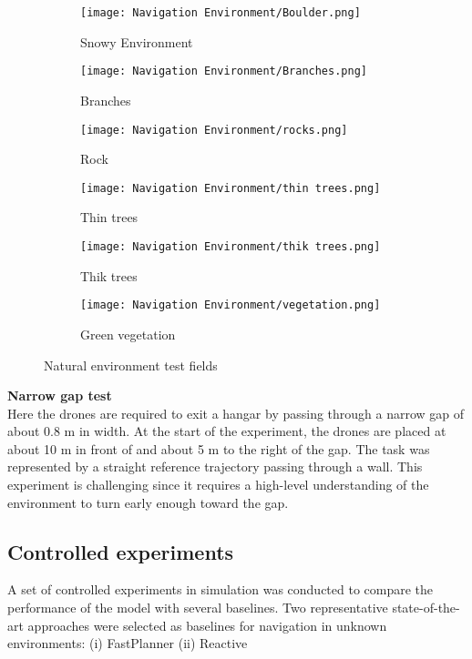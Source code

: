 \begin{figure}[!h]
	\centering
	\begin{subfigure}[b]{0.29\textwidth}
		\centering
		\texttt{[image: Navigation Environment/Boulder.png]}
		\caption{Snowy Environment}
	\end{subfigure}
	\hfill
	\begin{subfigure}[b]{0.29\textwidth}
		\centering
		\texttt{[image: Navigation Environment/Branches.png]}
		\caption{Branches}
	\end{subfigure}
	\hfill	
	\begin{subfigure}[b]{0.29\textwidth}
		\centering
		\texttt{[image: Navigation Environment/rocks.png]}
		\caption{Rock}
	\end{subfigure}
	\hfill
	\begin{subfigure}[b]{0.29\textwidth}
		\centering
		\texttt{[image: Navigation Environment/thin trees.png]}
		\caption{Thin trees}
	\end{subfigure}
	\hfill
	\begin{subfigure}[b]{0.29\textwidth}
		\centering
		\texttt{[image: Navigation Environment/thik trees.png]}
		\caption{Thik trees}
	\end{subfigure}
	\hfill
	\begin{subfigure}[b]{0.29\textwidth}
		\centering
		\texttt{[image: Navigation Environment/vegetation.png]}
		\caption{Green vegetation}
	\end{subfigure}
	
	\caption{Natural environment test fields}
	\label{fig:natural envt}
\end{figure}

\textbf{Narrow gap test}\\
Here the drones are required to exit a hangar by passing through a narrow gap of about 0.8 m in width. At the start of the experiment, the drones are placed at about 10 m in front of and about 5 m
to the right of the gap. The task was represented by a straight reference
trajectory passing through a wall. This experiment is challenging since it requires a high-level understanding of the
environment to turn early enough toward the gap. 

\subsection{Controlled experiments}
A set of controlled experiments in simulation was conducted to compare
the performance of the model with several baselines. Two representative state-of-the-art approaches were selected as baselines for navigation in
unknown environments: (i) FastPlanner (ii) Reactive

